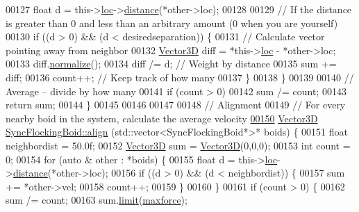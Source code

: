 \begin{DoxyCode}
00127         \textcolor{keywordtype}{float} d = this->\hyperlink{class_sync_flocking_boid_a1448999018acaa4ec3117ee2bbee2b02}{loc}->\hyperlink{class_vector3_d_a9a7e9d08bcee80d419986b875d704e5e}{distance}(*other->loc);
00128         
00129         \textcolor{comment}{// If the distance is greater than 0 and less than an arbitrary amount (0 when you are yourself)}
00130         \textcolor{keywordflow}{if} ((d > 0) && (d < desiredseparation)) \{
00131             \textcolor{comment}{// Calculate vector pointing away from neighbor}
00132             \hyperlink{class_vector3_d}{Vector3D} diff = *this->\hyperlink{class_sync_flocking_boid_a1448999018acaa4ec3117ee2bbee2b02}{loc} - *other->loc;
00133             diff.\hyperlink{class_vector3_d_abfb12ecb9c9beb88e095cc4a1a512d3c}{normalize}();
00134             diff /= d;        \textcolor{comment}{// Weight by distance}
00135             sum += diff;
00136             count++;            \textcolor{comment}{// Keep track of how many}
00137         \}
00138     \}
00139     
00140     \textcolor{comment}{// Average -- divide by how many}
00141     \textcolor{keywordflow}{if} (count > 0)
00142         sum /= count;
00143     \textcolor{keywordflow}{return} sum;
00144 \}
00145 
00146 
00147 
00148 \textcolor{comment}{// Alignment}
00149 \textcolor{comment}{// For every nearby boid in the system, calculate the average velocity}
\hypertarget{_sync_flocking_boid_8cpp_source_l00150}{}\hyperlink{class_sync_flocking_boid_afdffc148b6eb1062aac75fe081af344f}{00150} \hyperlink{class_vector3_d}{Vector3D} \hyperlink{class_sync_flocking_boid_afdffc148b6eb1062aac75fe081af344f}{SyncFlockingBoid::align} (std::vector<SyncFlockingBoid*>* boids) \{
00151     \textcolor{keywordtype}{float} neighbordist = 50.0f;
00152     \hyperlink{class_vector3_d}{Vector3D} sum = \hyperlink{class_vector3_d}{Vector3D}(0,0,0);
00153     \textcolor{keywordtype}{int} count = 0;
00154     \textcolor{keywordflow}{for} (\textcolor{keyword}{auto} & other : *boids) \{
00155         \textcolor{keywordtype}{float} d = this->\hyperlink{class_sync_flocking_boid_a1448999018acaa4ec3117ee2bbee2b02}{loc}->\hyperlink{class_vector3_d_a9a7e9d08bcee80d419986b875d704e5e}{distance}(*other->loc);
00156         \textcolor{keywordflow}{if} ((d > 0) && (d < neighbordist)) \{
00157             sum += *other->vel;
00158             count++;
00159         \}
00160     \}
00161     \textcolor{keywordflow}{if} (count > 0) \{
00162         sum /= count;
00163         sum.\hyperlink{class_vector3_d_a662cc3834556d61ed29890135c280b04}{limit}(\hyperlink{class_sync_flocking_boid_add7d9f2bf292a749bd17e730027e7350}{maxforce});

\end{DoxyCode}
